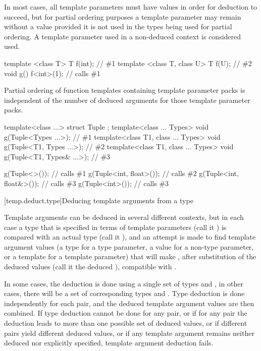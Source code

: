 \pnum
In most cases, all template parameters must have values in order for
deduction to succeed, but for partial ordering purposes a template
parameter may remain without a value provided it is not used in the
types being used for partial ordering.
\enternote
A template parameter used in a non-deduced context is considered used.
\exitnote
\enterexample
\begin{codeblock}
template <class T> T f(int);        // \#1
template <class T, class U> T f(U); // \#2
void g() {
  f<int>(1);        // calls \#1
}
\end{codeblock}
\exitexample

\pnum
\enternote Partial ordering of function templates containing
template parameter packs is independent of the number of deduced arguments
for those template parameter packs. \exitnote \enterexample

\begin{codeblock}
template<class ...> struct Tuple { };
template<class ... Types> void g(Tuple<Types ...>);                 // \#1
template<class T1, class ... Types> void g(Tuple<T1, Types ...>);   // \#2
template<class T1, class ... Types> void g(Tuple<T1, Types& ...>);  // \#3

g(Tuple<>());                   // calls \#1
g(Tuple<int, float>());         // calls \#2
g(Tuple<int, float&>());        // calls \#3
g(Tuple<int>());                // calls \#3
\end{codeblock}

\exitexample

[temp.deduct.type]{Deducing template arguments from a type}

\pnum
Template arguments can be deduced in several different contexts, but
in each case a type that is specified in terms of template parameters
(call it
)
is compared with an actual type (call it
),
and an attempt is made to find template argument values (a type for a type
parameter, a value for a non-type parameter, or a template for a
template parameter) that will make
,
after substitution of the deduced values (call it the deduced
),
compatible with
.

\pnum
In some cases, the deduction is done using a single set of types
and
,
in other cases, there will be a set of corresponding types
and
.
Type deduction is done
independently for each
pair, and the deduced template
argument values are then combined.
If type deduction cannot be done
for any
pair, or if for any pair the deduction leads to more than
one possible set of deduced values, or if different pairs yield
different deduced values, or if any template argument remains neither
deduced nor explicitly specified, template argument deduction fails.

